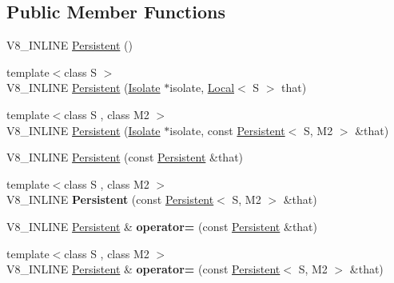 \subsection*{Public Member Functions}
\begin{DoxyCompactItemize}
\item 
V8\+\_\+\+I\+N\+L\+I\+NE \mbox{\hyperlink{classv8_1_1Persistent_a5ce14612215393683d814056015a102d}{Persistent}} ()
\item 
{\footnotesize template$<$class S $>$ }\\V8\+\_\+\+I\+N\+L\+I\+NE \mbox{\hyperlink{classv8_1_1Persistent_aabe9a42d7971bd31173bca34186d9ac2}{Persistent}} (\mbox{\hyperlink{classv8_1_1Isolate}{Isolate}} $\ast$isolate, \mbox{\hyperlink{classv8_1_1Local}{Local}}$<$ S $>$ that)
\item 
{\footnotesize template$<$class S , class M2 $>$ }\\V8\+\_\+\+I\+N\+L\+I\+NE \mbox{\hyperlink{classv8_1_1Persistent_aaf9eb7c4e6d0ef2c81a2c08238653578}{Persistent}} (\mbox{\hyperlink{classv8_1_1Isolate}{Isolate}} $\ast$isolate, const \mbox{\hyperlink{classv8_1_1Persistent}{Persistent}}$<$ S, M2 $>$ \&that)
\item 
V8\+\_\+\+I\+N\+L\+I\+NE \mbox{\hyperlink{classv8_1_1Persistent_a22331e91572784cd5ed5519739bb50c7}{Persistent}} (const \mbox{\hyperlink{classv8_1_1Persistent}{Persistent}} \&that)
\item 
\mbox{\label{classv8_1_1Persistent_ace17fd143fb6414d305871bf0a53ef57}} 
{\footnotesize template$<$class S , class M2 $>$ }\\V8\+\_\+\+I\+N\+L\+I\+NE {\bfseries Persistent} (const \mbox{\hyperlink{classv8_1_1Persistent}{Persistent}}$<$ S, M2 $>$ \&that)
\item 
\mbox{\label{classv8_1_1Persistent_aa1db9923b3212fb8ce57868217858b39}} 
V8\+\_\+\+I\+N\+L\+I\+NE \mbox{\hyperlink{classv8_1_1Persistent}{Persistent}} \& {\bfseries operator=} (const \mbox{\hyperlink{classv8_1_1Persistent}{Persistent}} \&that)
\item 
\mbox{\label{classv8_1_1Persistent_a11104ee8739cb1f25e40fd17d746b48f}} 
{\footnotesize template$<$class S , class M2 $>$ }\\V8\+\_\+\+I\+N\+L\+I\+NE \mbox{\hyperlink{classv8_1_1Persistent}{Persistent}} \& {\bfseries operator=} (const \mbox{\hyperlink{classv8_1_1Persistent}{Persistent}}$<$ S, M2 $>$ \&that)

\end{DoxyCompactItemize}
